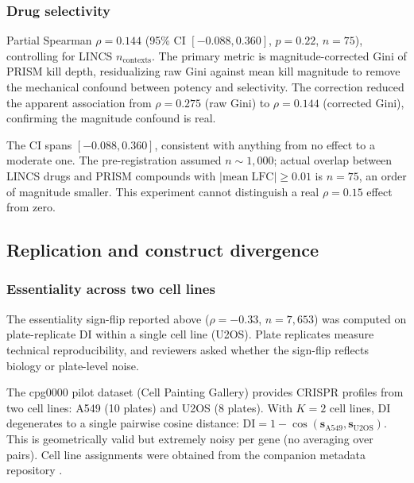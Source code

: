 \documentclass[11pt]{article}
\begin{document}
\subsubsection{Drug selectivity}

Partial Spearman $\rho = 0.144$ (95\% CI $[-0.088, 0.360]$,
$p = 0.22$, $n = 75$), controlling for LINCS $n_{\mathrm{contexts}}$.
The primary metric is magnitude-corrected Gini of PRISM kill depth,
residualizing raw Gini against mean kill magnitude to remove the
mechanical confound between potency and selectivity.  The correction
reduced the apparent association from $\rho = 0.275$ (raw Gini) to
$\rho = 0.144$ (corrected Gini), confirming the magnitude confound is
real.

The CI spans $[-0.088, 0.360]$, consistent with anything from no effect
to a moderate one.  The pre-registration assumed $n \sim 1{,}000$;
actual overlap between LINCS drugs and PRISM compounds with
$|\mathrm{mean\;LFC}| \geq 0.01$ is $n = 75$, an order of magnitude
smaller.  This experiment cannot distinguish a real $\rho = 0.15$ effect
from zero.


\subsection{Replication and construct divergence}
\label{sec:batch3}

\subsubsection{Essentiality across two cell lines}

The essentiality sign-flip reported above ($\rho = -0.33$, $n = 7{,}653$) was
computed on plate-replicate DI within a single cell line (U2OS).  Plate
replicates measure technical reproducibility, and reviewers asked whether
the sign-flip reflects biology or plate-level noise.

The cpg0000 pilot dataset (Cell Painting Gallery) provides CRISPR
profiles from two cell lines: A549 (10 plates) and U2OS (8 plates).
With $K = 2$ cell lines, DI degenerates to a single pairwise cosine
distance: $\mathrm{DI} = 1 - \cos(\mathbf{s}_{\mathrm{A549}},
\mathbf{s}_{\mathrm{U2OS}})$.  This is geometrically valid but
extremely noisy per gene (no averaging over pairs).  Cell line
assignments were obtained from the companion metadata repository
\citep{chandrasekaran2024cpjump1}.
\end{document}
